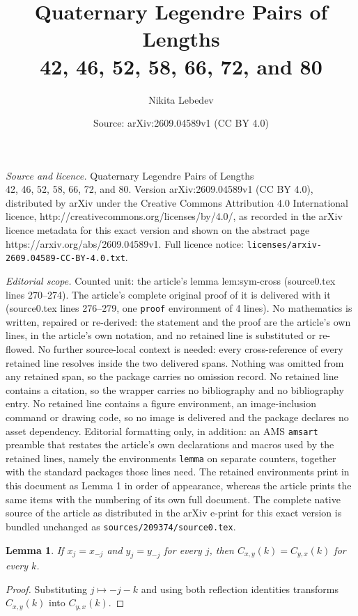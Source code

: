 \documentclass[10pt,a4paper]{amsart}
\title{Quaternary Legendre Pairs of Lengths\\42, 46, 52, 58, 66, 72, and 80}
\author{Nikita Lebedev}
\date{Source: arXiv:2609.04589v1 (CC BY 4.0)}
\newtheorem{lemma}{Lemma}
\begin{document}
\maketitle

\noindent\emph{Source and licence.} Quaternary Legendre Pairs of Lengths\\42, 46, 52, 58, 66, 72, and 80. Version arXiv:2609.04589v1 (CC BY 4.0), distributed by arXiv under the Creative Commons Attribution 4.0 International licence, http://creativecommons.org/licenses/by/4.0/, as recorded in the arXiv licence metadata for this exact version and shown on the abstract page https://arxiv.org/abs/2609.04589v1. Full licence notice: \texttt{licenses/arxiv-2609.04589-CC-BY-4.0.txt}.\par\smallskip

\noindent\textit{Editorial scope.} Counted unit: the article's lemma lem:sym-cross (source0.tex lines 270--274). The article's complete original proof of it is delivered with it (source0.tex lines 276--279, one \texttt{proof} environment of 4 lines). No mathematics is written, repaired or re-derived: the statement and the proof are the article's own lines, in the article's own notation, and no retained line is substituted or re-flowed.  No further source-local context is needed: every cross-reference of every retained line resolves inside the two delivered spans.  Nothing was omitted from any retained span, so the package carries no omission record.  No retained line contains a citation, so the wrapper carries no bibliography and no bibliography entry.  No retained line contains a figure environment, an image-inclusion command or drawing code, so no image is delivered and the package declares no asset dependency.  Editorial formatting only, in addition: an AMS \texttt{amsart} preamble that restates the article's own declarations and macros used by the retained lines, namely the environments \texttt{lemma} on separate counters, together with the standard packages those lines need.  The retained environments print in this document as Lemma 1 in order of appearance, whereas the article prints the same items with the numbering of its own full document.  The complete native source of the article as distributed in the arXiv e-print for this exact version is bundled unchanged as \texttt{sources/209374/source0.tex}.
\begin{lemma}
\label{lem:sym-cross}
If $x_j=x_{-j}$ and $y_j=y_{-j}$ for every $j$, then $C_{x,y}(k)=C_{y,x}(k)$
for every $k$.
\end{lemma}

\begin{proof}
Substituting $j\mapsto -j-k$ and using both reflection identities transforms
$C_{x,y}(k)$ into $C_{y,x}(k)$.
\end{proof}
\end{document}
